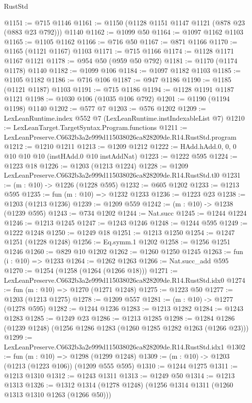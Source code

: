 \begin{lexlean}{RustStd}
\begin{coremodule}
@1151 := @715 @1146
@1161 := @1150 (@1128 @1151 @1147 @1121 (@878 @23 (@883 @23 @792))) @1140
@1162 := @1099 @50
@1164 := @1097 @1162 @1103
@1165 := @1105 @1162
@1166 := @716 @50
@1167 := @871 @1166
@1170 := @1165 (@1121 @1167) @1103
@1171 := @715 @1166
@1174 := @1128 @1171 @1167 @1121
@1178 := @954 @50 (@959 @50 @792)
@1181 := @1170 (@1174 @1178) @1140
@1182 := @1099 @106
@1184 := @1097 @1182 @1103
@1185 := @1105 @1182
@1186 := @716 @106
@1187 := @947 @1186
@1190 := @1185 (@1121 @1187) @1103
@1191 := @715 @1186
@1194 := @1128 @1191 @1187 @1121
@1198 := @1030 @106 (@1035 @106 @792)
@1201 := @1190 (@1194 @1198) @1140
@1202 := @577 @7
@1203 := @576 @1202
@1209 := LexLeanRuntime.index @552 @7 (LexLeanRuntime.instIndexableList @7)
@1210 := LexLeanTarget.TargetSyntax.Program.functions
@1211 := LexLeanPreserve.C6632b3a2e999d115038026ca828209de.R14.RustStd.program
@1212 := @1210 @1211
@1213 := @1209 @1212
@1222 := HAdd.hAdd.{0, 0, 0} @10 @10 @10 (instHAdd.{0} @10 instAddNat)
@1223 := @1222 @595
@1224 := @1223 @18
@1226 := @1203 (@1213 @1224)
@1228 := @1209 LexLeanPreserve.C6632b3a2e999d115038026ca828209de.R14.RustStd.tl0
@1231 := (m : @10) -> @1226 (@1228 @595)
@1232 := @605 @1202
@1233 := @1213 @595
@1235 := fun (m : @10) => @1232 @1233
@1236 := @1223 @23
@1238 := @1203 (@1213 @1236)
@1239 := @1209 @559
@1242 := (m : @10) -> @1238 (@1239 @595)
@1243 := @734 @1202
@1244 := Nat.succ
@1245 := @1244 @1224
@1246 := @1213 @1245
@1247 := @1243 @1246
@1248 := @1244 @595
@1249 := @1222 @1248
@1250 := @1249 @18
@1251 := @1213 @1250
@1254 := @1247 @1251 (@1228 @1248)
@1256 := Eq.symm.{1} @1202
@1258 := @1256 @1251 @1246
@1260 := @829 @10 @1202
@1262 := @1260 @1250 @1245
@1263 := fun (i : @10) => @1233
@1264 := @1262 @1263
@1266 := Nat.succ_add @595
@1270 := @1254 (@1258 (@1264 (@1266 @18)))
@1271 := LexLeanPreserve.C6632b3a2e999d115038026ca828209de.R14.RustStd.idx0
@1274 := fun (m : @10) => @1270 (@1271 @1248)
@1275 := @1223 @50
@1277 := @1203 (@1213 @1275)
@1278 := @1209 @557
@1281 := (m : @10) -> @1277 (@1278 @595)
@1282 := @1244 @1236
@1283 := @1213 @1282
@1284 := @1243 @1283
@1285 := @1249 @23
@1286 := @1213 @1285
@1298 := @1284 @1286 (@1239 @1248) (@1256 @1286 @1283 (@1260 @1285 @1282 @1263 (@1266 @23)))
@1299 := LexLeanPreserve.C6632b3a2e999d115038026ca828209de.R14.RustStd.idx1
@1302 := fun (m : @10) => @1298 (@1299 @1248)
@1309 := (m : @10) -> @1203 (@1213 (@1223 @106)) (@1209 @555 @595)
@1310 := @1244 @1275
@1311 := @1213 @1310
@1312 := @1243 @1311
@1313 := @1249 @50
@1314 := @1213 @1313
@1326 := @1312 @1314 (@1278 @1248) (@1256 @1314 @1311 (@1260 @1313 @1310 @1263 (@1266 @50)))

\end{coremodule}
\end{lexlean}
